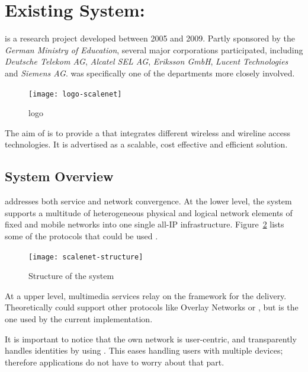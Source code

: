 \section{Existing System: } %
\label{sec:scalenet}

 \cite{SIE06} is a research project developed between 2005 and 2009.
Partly sponsored by the \emph{German Ministry of Education}, several major corporations participated, including \emph{Deutsche Telekom AG}, \emph{Alcatel SEL AG}, \emph{Eriksson GmbH}, \emph{Lucent Technologies} and \emph{Siemens AG}.
 was specifically one of the departments more closely involved.

\begin{figure}
  \centering
    \texttt{[image: logo-scalenet]}
  \caption{ logo}
  \label{fig:logo-scalenet}
\end{figure}

The aim of  is to provide a  that integrates different wireless and wireline access technologies.
It is advertised as a scalable, cost effective and efficient  solution.

\subsection{System Overview} %
\label{sub:overviewscalenet}

 addresses both service and network convergence.
At the lower level, the system supports a multitude of heterogeneous physical and logical network elements of fixed and mobile networks into one single all-IP infrastructure.
Figure~\ref{fig:scalenet-structure} lists some of the protocols that could be used \cite{SIV08}.

\begin{figure}[htbp]
  \centering
    \texttt{[image: scalenet-structure]}
  \caption{Structure of the system}
  \label{fig:scalenet-structure}
\end{figure}

At a upper level, multimedia services relay on the  framework for the delivery.
Theoretically  could support other protocols like Overlay Networks or , but  is the one used by the current implementation.

It is important to notice that the own network is user-centric, and transparently handles identities by using .
This eases handling users with multiple devices; therefore applications do not have to worry about that part.

